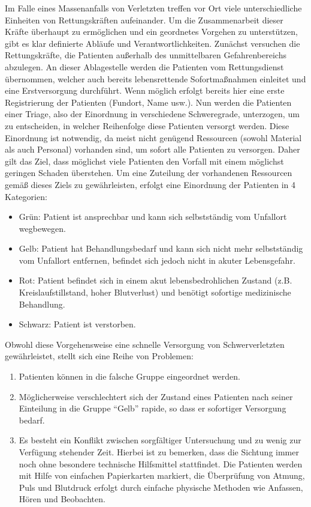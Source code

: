 Im Falle eines Massenanfalls von Verletzten treffen vor Ort viele unterschiedliche Einheiten von
Rettungskräften aufeinander. Um die Zusammenarbeit dieser Kräfte überhaupt zu ermöglichen und ein
geordnetes Vorgehen zu unterstützen, gibt es klar definierte Abläufe und Verantwortlichkeiten. Zunächst
versuchen die Rettungskräfte, die Patienten außerhalb des unmittelbaren Gefahrenbereichs abzulegen.
An dieser Ablagestelle werden die Patienten vom Rettungsdienst übernommen, welcher auch bereits
lebensrettende Sofortmaßnahmen einleitet und eine Erstversorgung durchführt. Wenn möglich erfolgt
bereits hier eine erste Registrierung der Patienten (Fundort, Name usw.).
Nun werden die Patienten einer Triage, also der Einordnung in verschiedene Schweregrade,
unterzogen, um zu entscheiden, in welcher Reihenfolge diese Patienten versorgt werden.
Diese Einordnung ist notwendig, da meist nicht genügend Ressourcen (sowohl Material als auch
Personal) vorhanden sind, um sofort alle Patienten zu versorgen. Daher gilt das Ziel, dass möglichst
viele Patienten den Vorfall mit einem möglichst geringen Schaden überstehen. Um eine Zuteilung der
vorhandenen Ressourcen gemäß dieses Ziels zu gewährleisten, erfolgt eine Einordnung der Patienten in
4 Kategorien:

\begin{itemize}
    \item{Grün:} Patient ist ansprechbar und kann sich selbstständig vom Unfallort wegbewegen.
    \item{Gelb:} Patient hat Behandlungsbedarf und kann sich nicht mehr selbstständig vom Unfallort entfernen, 
                 befindet sich jedoch nicht in akuter Lebensgefahr.
    \item{Rot:}  Patient befindet sich in einem akut lebensbedrohlichen Zustand (z.B. Kreislaufstillstand, hoher
                 Blutverlust) und benötigt sofortige medizinische Behandlung.
    \item{Schwarz:} Patient ist verstorben.
\end{itemize}

Obwohl diese Vorgehensweise eine schnelle Versorgung von Schwerverletzten gewährleistet, stellt
sich eine Reihe von Problemen:

\begin{enumerate}
    \item Patienten können in die falsche Gruppe eingeordnet werden.
    \item Möglicherweise verschlechtert sich der Zustand eines Patienten nach seiner Einteilung in die Gruppe
          "`Gelb"' rapide, so dass er sofortiger Versorgung bedarf.
    \item Es besteht ein Konflikt zwischen sorgfältiger Untersuchung und zu wenig zur Verfügung stehender
          Zeit. Hierbei ist zu bemerken, dass die Sichtung immer noch ohne besondere technische Hilfsmittel
          stattfindet. Die Patienten werden mit Hilfe von einfachen Papierkarten markiert, die Überprüfung von
          Atmung, Puls und Blutdruck erfolgt durch einfache physische Methoden wie Anfassen, Hören und
          Beobachten.
\end{enumerate}

